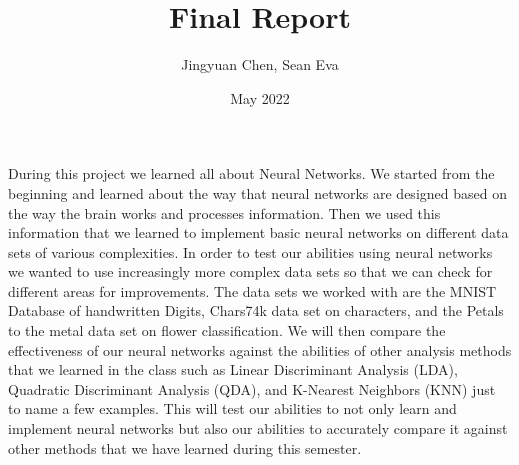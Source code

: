\documentclass{article}
\title{Final Report}
\author{Jingyuan Chen, Sean Eva}
\date{May 2022}
\begin{document}
\maketitle

\pagebreak

During this project we learned all about Neural Networks. We started from the beginning and learned about the way that neural networks are designed based on the way the brain works and processes information. Then we used this information that we learned to implement basic neural networks on different data sets of various complexities. In order to test our abilities using neural networks we wanted to use increasingly more complex data sets so that we can check for different areas for improvements. The data sets we worked with are the MNIST Database of handwritten Digits, Chars74k data set on characters, and the Petals to the metal data set on flower classification. We will then compare the effectiveness of our neural networks against the abilities of other analysis methods that we learned in the class such as Linear Discriminant Analysis (LDA), Quadratic Discriminant Analysis (QDA), and K-Nearest Neighbors (KNN) just to name a few examples. This will test our abilities to not only learn and implement neural networks but also our abilities to accurately compare it against other methods that we have learned during this semester.

\pagebreak
\end{document}
